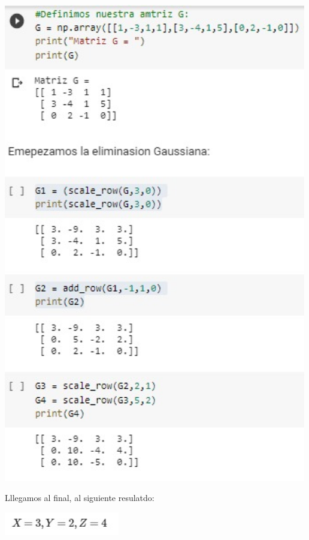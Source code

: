 \documentclass[12pt]{article}
\begin{document}
    \begin{center}
	\includegraphics[height=21cm]{E3.2.jpeg}\\
    \end{center}
    
Lllegamos al final, al siguiente resulatdo:

    \begin{center}
	\includegraphics[height=1cm]{E3.3.jpeg}\\
    \end{center}
\end{document}
